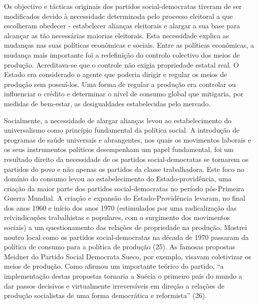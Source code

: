 \documentclass[twocolumn,amsmath,amssymb,aps,pre,floatfix]{revtex4-2}
\begin{document}
\par
Os objectivo e tácticas originais dos partidos social-democratas tiveram de ser modificados devido à necessidade determinada pelo processo eleitoral a que escolheram obedecer - estabelecer alianças eleitorais e alargar a sua base para alcançar as tão necessárias maiorias eleitorais. Esta necessidade explica as mudanças nas suas políticas econômicas e sociais. Entre as políticas econômicas, a mudança mais importante foi a redefinição do controlo colectivo dos meios de produção. Acreditava-se que o controle não exigia propriedade estatal real. O Estado era considerado o agente que poderia dirigir e regular os meios de produção sem possuí-los. Uma forma de regular a produção era controlar ou influenciar o crédito e determinar o nível de consumo global que mitigaria, por medidas de bem-estar, as desigualdades estabelecidas pelo mercado.
\par
Socialmente, a necessidade de alargar alianças levou ao estabelecimento do universalismo como princípio fundamental da política social. A introdução de programas de saúde universais e abrangentes, nos quais os movimentos laborais e os seus instrumentos políticos desempenham um papel fundamental, foi um resultado direito da necessidade de os partidos social-democratas se tornarem os partidos do povo e não apenas os partidos da classe trabalhadora. Este foco no domínio do consumo levou ao estabelecimento do Estado-providência, uma criação da maior parte dos partidos social-democratas no período pós-Primeira Guerra Mundial. A criação e expansão do Estado-Providência levaram, no final dos anos 1960 e início dos anos 1970 (estimulados por uma radicalização das reivindicações trabalhistas e populares, com o surgimento dos movimentos sociais) a um questionamento das relações de propriedade na produção. Mostrei noutro local como os partidos social-democratas na década de 1970 passaram da política de consumo para a política de produção (25). As famosas propostas Meidner do Partido Social Democrata Sueco, por exemplo, visavam coletivizar os meios de produção. Como afirmou um importante teórico do partido, “a implementação destas propostas tornaria a Suécia o primeiro país do mundo a dar passos decisivos e virtualmente irreversíveis em direção a relações de produção socialistas de uma forma democrática e reformista” (26).
\par
\end{document}
